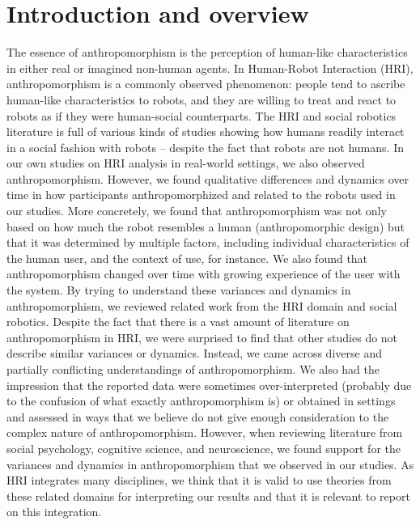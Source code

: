 \documentclass{frontiersSCNS} %
\begin{document}
\section{Introduction and overview}
\label{sec:intro}

The essence of anthropomorphism is the perception of human-like characteristics
in either real or imagined non-human agents. In Human-Robot Interaction (HRI),
anthropomorphism is a commonly observed phenomenon: people tend to ascribe
human-like characteristics to robots, and they are willing to treat and react to
robots as if they were human-social counterparts. The HRI and social robotics
literature is full of various kinds of studies showing how humans readily
interact in a social fashion with robots -- despite the fact that robots are not
humans. In our own studies on HRI analysis in real-world settings, we also
observed anthropomorphism. However, we found qualitative differences and
dynamics over time in how participants anthropomorphized and related to the
robots used in our studies. More concretely, we found that anthropomorphism was
not only based on how much the robot resembles a human (anthropomorphic design)
but that it was determined by multiple factors, including individual
characteristics of the human user, and the context of use, for instance. We also
found that anthropomorphism changed over time with growing experience of the
user with the system. By trying to understand these variances and dynamics in
anthropomorphism, we reviewed related work from the HRI domain and social
robotics. Despite the fact that there is a vast amount of literature on
anthropomorphism in HRI, we were surprised to find that other studies do not
describe similar variances or dynamics. Instead, we came across diverse and
partially conflicting understandings of anthropomorphism. We also had the
impression that the reported data were sometimes over-interpreted (probably due
to the confusion of what exactly anthropomorphism is) or obtained in settings
and assessed in ways that we believe do not give enough consideration to the
complex nature of anthropomorphism. However, when reviewing literature from
social psychology, cognitive science, and neuroscience, we found support for the
variances and dynamics in anthropomorphism that we observed in our studies. As
HRI integrates many disciplines, we think that it is valid to use theories from
these related domains for interpreting our results and that it is relevant to
report on this integration.
\end{document}
